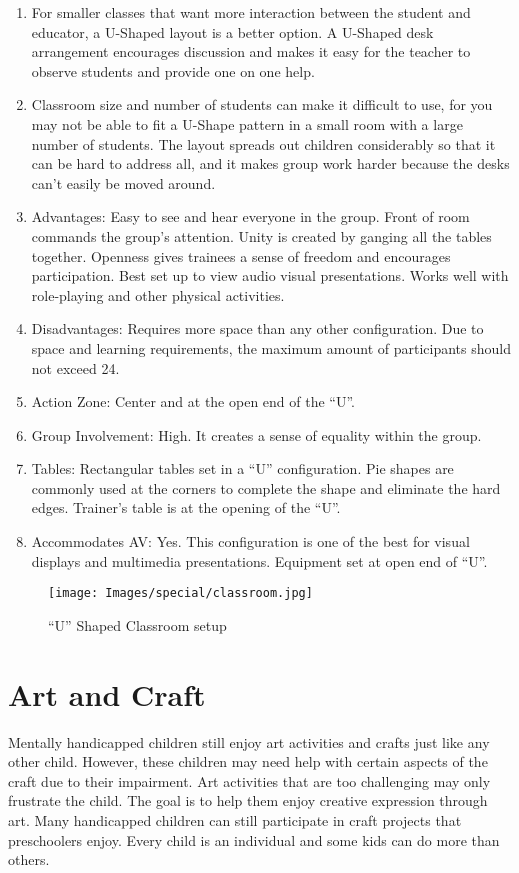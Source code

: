 \begin{enumerate}
    \item For smaller classes that want more interaction between the student and educator, a U-Shaped layout is a better option. A U-Shaped desk arrangement encourages discussion and makes it easy for the teacher to observe students and provide one on one help.
    \item Classroom size and number of students can make it difficult to use, for you may not be able to fit a U-Shape pattern in a small room with a large number of students. The layout spreads out children considerably so that it can be hard to address all, and it makes group work harder because the desks can’t easily be moved around.
    \item Advantages: Easy to see and hear everyone in the group. Front of room commands the group’s attention. Unity is created by ganging all the tables together. Openness gives trainees a sense of freedom and encourages participation. Best set up to view audio visual presentations. Works well with role-playing and other physical activities.
    \item Disadvantages: Requires more space than any other configuration. Due to space and learning requirements, the maximum amount of participants should not exceed 24.
    \item Action Zone: Center and at the open end of the ``U''.
    \item Group Involvement: High. It creates a sense of equality within the group.
    \item Tables: Rectangular tables set in a ``U'' configuration. Pie shapes are commonly used at the corners to complete the shape and eliminate the hard edges. Trainer’s table is at the opening of the ``U''.
    \item Accommodates AV: Yes. This configuration is one of the best for visual displays and multimedia presentations. Equipment set at open end of ``U''.
\end{enumerate}

\begin{figure}[H]
    \centering
    \texttt{[image: Images/special/classroom.jpg]}
    \caption*{``U'' Shaped Classroom setup}
\end{figure}

\section{Art and Craft}
Mentally handicapped children still enjoy art activities and crafts just like any other child. However, these children may need help with certain aspects of the craft due to their impairment. Art activities that are too challenging may only frustrate the child. The goal is to help them enjoy creative expression through art. Many handicapped children can still participate in craft projects that preschoolers enjoy. Every child is an individual and some kids can do more than others.\\

